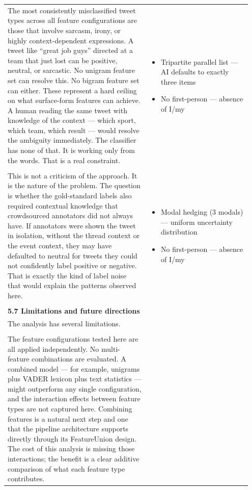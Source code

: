 \documentclass[11pt]{article}
\begin{document}
\begin{longtable}{|p{0.55\linewidth}|p{0.40\linewidth}|}
\hline
\rule{0pt}{3.5cm} & \\
\hline
The most consistently misclassified tweet types across all feature configurations are those that involve sarcasm, irony, or highly context-dependent expressions. A tweet like ``great job guys'' directed at a team that just lost can be positive, neutral, or sarcastic. No unigram feature set can resolve this. No bigram feature set can either. These represent a hard ceiling on what surface-form features can achieve. A human reading the same tweet with knowledge of the context --- which sport, which team, which result --- would resolve the ambiguity immediately. The classifier has none of that. It is working only from the words. That is a real constraint. & \begin{itemize}[leftmargin=1em,itemsep=1pt,topsep=1pt,parsep=0pt]
  \item Tripartite parallel list --- AI defaults to exactly three items
  \item No first-person --- absence of I/my
\end{itemize} \\[2pt]
\hline
\rule{0pt}{3.5cm} & \\
\hline
This is not a criticism of the approach. It is the nature of the problem. The question is whether the gold-standard labels also required contextual knowledge that crowdsourced annotators did not always have. If annotators were shown the tweet in isolation, without the thread context or the event context, they may have defaulted to neutral for tweets they could not confidently label positive or negative. That is exactly the kind of label noise that would explain the patterns observed here. & \begin{itemize}[leftmargin=1em,itemsep=1pt,topsep=1pt,parsep=0pt]
  \item Modal hedging (3 modals) --- uniform uncertainty distribution
  \item No first-person --- absence of I/my
\end{itemize} \\[2pt]
\hline
\rule{0pt}{3.5cm} & \\
\hline
\textbf{5.7 Limitations and future directions}\\[4pt]
The analysis has several limitations. &  \\[2pt]
\hline
\rule{0pt}{3.5cm} & \\
\hline
The feature configurations tested here are all applied independently. No multi-feature combinations are evaluated. A combined model --- for example, unigrams plus VADER lexicon plus text statistics --- might outperform any single configuration, and the interaction effects between feature types are not captured here. Combining features is a natural next step and one that the pipeline architecture supports directly through its FeatureUnion design. The cost of this analysis is missing those interactions; the benefit is a clear additive comparison of what each feature type contributes. & \begin{itemize}[leftmargin=1em,itemsep=1pt,topsep=1pt,parsep=0pt]

\end{itemize}
\end{longtable}
\end{document}
